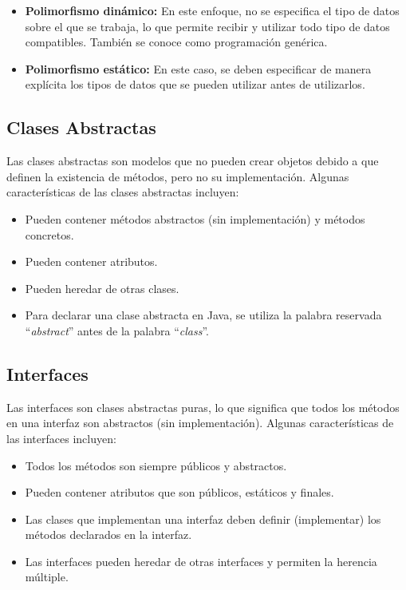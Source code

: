 \documentclass[11pt, twocolumn]{article}
\begin{document}
  \begin{itemize}
    \item \textbf{Polimorfismo dinámico:} En este enfoque, no se especifica el tipo de datos sobre el que se trabaja, lo que permite recibir y utilizar todo tipo de datos compatibles. También se conoce como programación genérica.
    \item \textbf{Polimorfismo estático:} En este caso, se deben especificar de manera explícita los tipos de datos que se pueden utilizar antes de utilizarlos.
  \end{itemize}

  \subsection*{Clases Abstractas}
  Las clases abstractas son modelos que no pueden crear objetos debido a que definen la existencia de métodos, pero no su implementación. Algunas características de las clases abstractas incluyen:

  \begin{itemize}
    \item Pueden contener métodos abstractos (sin implementación) y métodos concretos.
    \item Pueden contener atributos.
    \item Pueden heredar de otras clases.
    \item Para declarar una clase abstracta en Java, se utiliza la palabra reservada ``\textit{abstract}'' antes de la palabra ``\textit{class}''.
  \end{itemize}

  \subsection*{Interfaces}
  Las interfaces son clases abstractas puras, lo que significa que todos los métodos en una interfaz son abstractos (sin implementación). Algunas características de las interfaces incluyen:

  \begin{itemize}
    \item Todos los métodos son siempre públicos y abstractos.
    \item	Pueden contener atributos que son públicos, estáticos y finales.
    \item	Las clases que implementan una interfaz deben definir (implementar) los métodos declarados en la interfaz.
    \item	Las interfaces pueden heredar de otras interfaces y permiten la herencia múltiple.
  \end{itemize}
\end{document}
